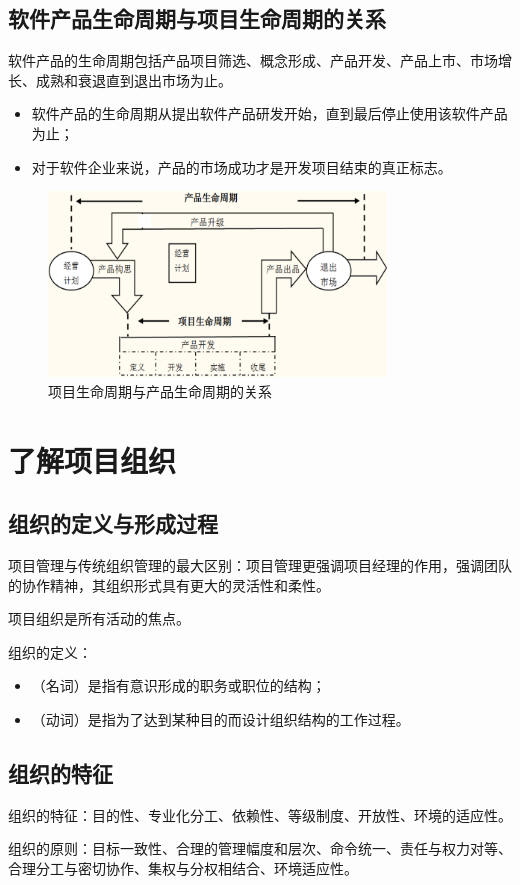 \subsection{软件产品生命周期与项目生命周期的关系}
软件产品的生命周期包括产品项目筛选、概念形成、产品开发、产品上市、市场增长、成熟和衰退直到退出市场为止。
\begin{itemize}
	\item 软件产品的生命周期从提出软件产品研发开始，直到最后停止使用该软件产品为止；
	\item 对于软件企业来说，产品的市场成功才是开发项目结束的真正标志。
\end{itemize}
\begin{figure}[!h]
	\centering
	\includegraphics[width=0.8\textwidth]{image/2-2}
	\caption{项目生命周期与产品生命周期的关系}
\end{figure}
\section{了解项目组织}
\subsection{组织的定义与形成过程}
项目管理与传统组织管理的最大区别：项目管理更强调项目经理的作用，强调团队的协作精神，其组织形式具有更大的灵活性和柔性。
\par 项目组织是所有活动的焦点。
\par 组织的定义：
\begin{itemize}
	\item （名词）是指有意识形成的职务或职位的结构；
	\item （动词）是指为了达到某种目的而设计组织结构的工作过程。
\end{itemize}
\subsection{组织的特征}
组织的特征：目的性、专业化分工、依赖性、等级制度、开放性、环境的适应性。
\par 组织的原则：目标一致性、合理的管理幅度和层次、命令统一、责任与权力对等、合理分工与密切协作、集权与分权相结合、环境适应性。
